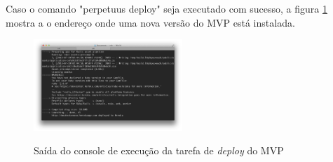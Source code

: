 Caso o comando "perpetuus deploy" seja executado com sucesso, a figura \ref{fig:fig13} mostra a o endere\c{c}o onde uma nova vers\~ao do MVP est\'a instalada.

\begin{figure}[h]
  \centering
  \caption{Sa\'ida do console de execu\c{c}\~ao da tarefa de \emph{deploy} do MVP}
  \includegraphics[width=0.5\textwidth]{./fig/setup5}
  \label{fig:fig13}
\end{figure}


